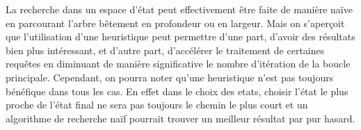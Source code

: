 \documentclass[a4paper,10pt]{report}
\begin{document}
  La recherche dans un espace d'état peut effectivement être faite de manière naïve en parcourant l'arbre bêtement en profondeur ou en largeur. Mais on s'aperçoit
  que l'utilisation d'une heuristique peut permettre d'une part, d'avoir des résultats bien plus intéressant, et d'autre part, d'accélérer le traitement de certaines 
  requêtes en diminuant de manière significative le nombre d'itération de la boucle principale. \newline 
  Cependant, on pourra noter qu'une heuristique n'est pas toujours bénéfique dans tous les cas. En effet dans le choix des etats, choisir l'état le plus proche de 
  l'état final ne sera pas toujours le chemin le plus court et un algorithme de recherche naïf pourrait trouver un meilleur résultat par pur hasard.
  
  
\end{document}
